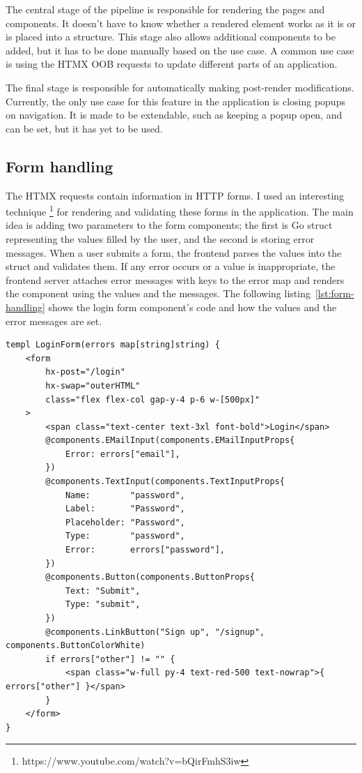 The central stage of the pipeline is responsible for rendering the pages and components. It doesn't have to know whether a rendered element works as it is or is placed into a structure. This stage also allows additional components to be added, but it has to be done manually based on the use case. A common use case is using the HTMX OOB requests to update different parts of an application.

The final stage is responsible for automatically making post-render modifications. Currently, the only use case for this feature in the application is closing popups on navigation. It is made to be extendable, such as keeping a popup open, and can be set, but it has yet to be used.

\subsection{Form handling}

The HTMX requests contain information in HTTP forms. I used an interesting technique \footnote{https://www.youtube.com/watch?v=bQirFmhS3iw} for rendering and validating these forms in the application. The main idea is adding two parameters to the form components; the first is Go struct representing the values filled by the user, and the second is storing error messages. When a user submits a form, the frontend parses the values into the struct and validates them. If any error occurs or a value is inappropriate, the frontend server attaches error messages with keys to the error map and renders the component using the values and the messages. The following listing~\ref{lst:form-handling} shows the login form component's code and how the values and the error messages are set.

\begin{lstlisting}[caption=Login form,label=lst:form-handling]
templ LoginForm(errors map[string]string) {
	<form
		hx-post="/login"
		hx-swap="outerHTML"
		class="flex flex-col gap-y-4 p-6 w-[500px]"
	>
		<span class="text-center text-3xl font-bold">Login</span>
		@components.EMailInput(components.EMailInputProps{
			Error: errors["email"],
		})
		@components.TextInput(components.TextInputProps{
			Name:        "password",
			Label:       "Password",
			Placeholder: "Password",
			Type:        "password",
			Error:       errors["password"],
		})
		@components.Button(components.ButtonProps{
			Text: "Submit",
			Type: "submit",
		})
		@components.LinkButton("Sign up", "/signup", components.ButtonColorWhite)
		if errors["other"] != "" {
			<span class="w-full py-4 text-red-500 text-nowrap">{ errors["other"] }</span>
		}
	</form>
}
\end{lstlisting}

